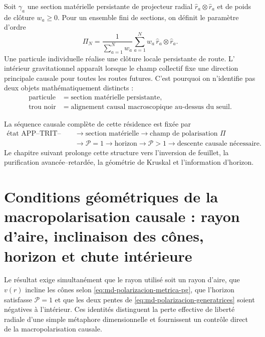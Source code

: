 Soit \(\gamma_a\) une section matérielle persistante de projecteur radial
\(\widehat r_a\otimes\widehat r_a\) et de poids de clôture \(w_a\geq0\). Pour un
ensemble fini de sections, on définit le paramètre d'ordre
\begin{equation}
 \Pi_N
 =\frac{1}{\sum_{a=1}^{N}w_a}
  \sum_{a=1}^{N}w_a\,
  \widehat r_a\otimes\widehat r_a.
 \label{eq:md-polarizacion-colectiva}
\end{equation}
Une particule individuelle réalise une clôture locale persistante de route. L'
intérieur gravitationnel apparaît lorsque le champ collectif fixe une direction
principale causale pour toutes les routes futures. C'est pourquoi on n'identifie pas deux
objets mathématiquement distincts :
\begin{equation}
\begin{aligned}
 \text{particule}
 &=\text{section matérielle persistante},\\
 \text{trou noir}
 &=\text{alignement causal macroscopique au-dessus du seuil}.
\end{aligned}
 \label{eq:md-polarizacion-distincion}
\end{equation}

La séquence causale complète de cette résidence est fixée par
\begin{equation}
\begin{aligned}
 \text{état APP--TRIT--TPK}
 &\longrightarrow
 \text{section matérielle}
 \longrightarrow
 \text{champ de polarisation }\Pi\\
 &\longrightarrow
 \mathcal P=1
 \longrightarrow
 \text{horizon}
 \longrightarrow
 \mathcal P>1
 \longrightarrow
 \text{descente causale nécessaire}.
\end{aligned}
 \label{eq:md-polarizacion-cadena}
\end{equation}
Le chapitre suivant prolonge cette structure vers l'inversion de feuillet,
la purification avancée--retardée, la géométrie de Kruskal et l'information
d'horizon.

\section{Conditions géométriques de la macropolarisation causale : rayon d'aire, inclinaison des cônes, horizon et chute intérieure}
\label{sec:md-polarizacion-control}

Le résultat exige simultanément que le rayon utilisé soit un rayon d'aire, que
\(v(r)\) incline les cônes selon \eqref{eq:md-polarizacion-metrica-pg}, que
l'horizon satisfasse \(\mathcal P=1\) et que les deux pentes de
\eqref{eq:md-polarizacion-generatrices} soient négatives à l'intérieur. Ces
identités distinguent la perte effective de liberté radiale d'une simple
métaphore dimensionnelle et fournissent un contrôle direct de la
macropolarisation causale.
